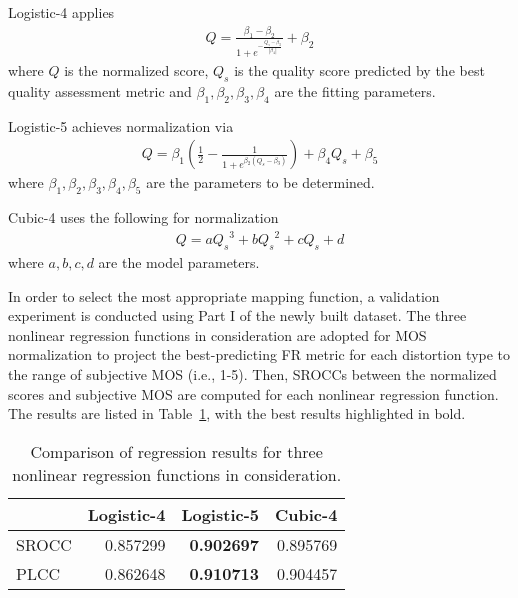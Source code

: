 \documentclass[acmsmall]{acmart}
\begin{document}
\par Logistic-4 applies
\begin{align}
Q = \frac{{{\beta _1} - {\beta _2}}}{{1 + {e^{ - \frac{{Q_s - {\beta _3}}}{{\left| {{\beta _4}} \right|}}}}}} + {\beta _2}
\end{align}
where $Q$ is the normalized score, $Q_s$ is the quality score predicted by the best quality assessment metric and ${\beta _1,\beta _2,\beta _3,\beta _4}$ are the fitting parameters.

\par Logistic-5 achieves normalization via
\begin{align}
Q = {\beta _1}\left( {\frac{1}{2} - \frac{1}{{1 + {e^{{\beta _2}({Q_s} - {\beta _3})}}}}} \right) + {\beta _4}{Q_s} + {\beta _5}
\end{align}
where ${\beta _1,\beta _2,\beta _3,\beta _4,\beta _5}$ are the parameters to be determined.

\par Cubic-4 uses the following for normalization
\begin{align}
Q = a{Q_s}^3 + b{Q_s}^2 + c{Q_s} + d
\end{align}
where ${a,b,c,d}$ are the model parameters.

\par In order to select the most appropriate mapping function, a validation experiment is conducted using Part I of the newly built dataset. The three nonlinear regression functions in consideration are adopted for MOS normalization to project the best-predicting FR metric for each distortion type to the range of subjective MOS (i.e., 1-5). Then, SROCCs between the normalized scores and subjective MOS are computed for each nonlinear regression function. The results are listed in Table~\ref{nonlinear}, with the best results highlighted in bold.


\begin{table}[htbp]
  \centering
  \caption{Comparison of regression results for three nonlinear regression functions in consideration.}
  \begin{footnotesize}
    \begin{tabular}{l|rrr}
    \hline
          & \multicolumn{1}{l}{Logistic-4} & \multicolumn{1}{l}{Logistic-5} & \multicolumn{1}{l}{Cubic-4} \\
    \hline
    SROCC & 0.857299 & \textbf{0.902697} & 0.895769 \\
    PLCC  & 0.862648 & \textbf{0.910713} & 0.904457 \\
    \hline
    \end{tabular}\end{footnotesize}
  \label{nonlinear}\end{table}
\end{document}

